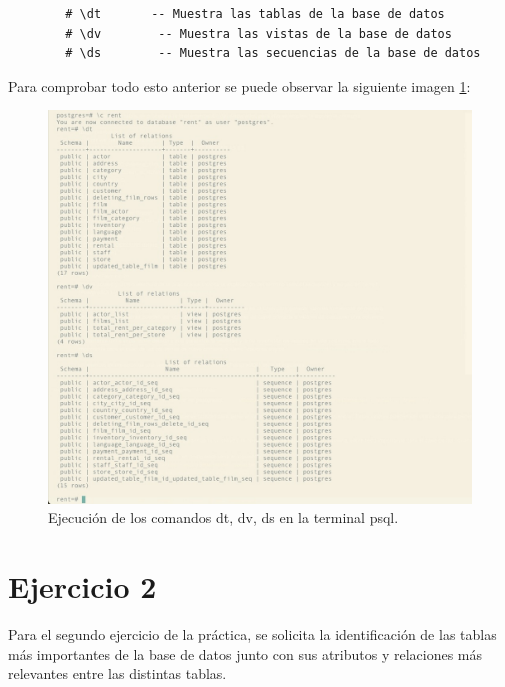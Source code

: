 \documentclass[11pt]{report}
\begin{document}
	\begin{verbatim}
		# \dt 		-- Muestra las tablas de la base de datos 
		# \dv		 -- Muestra las vistas de la base de datos
		# \ds		 -- Muestra las secuencias de la base de datos
	\end{verbatim}

	Para comprobar todo esto anterior se puede observar la siguiente imagen \ref{fig:Exercice-1}:

	\begin{figure}[H]
    \centering
    \includegraphics[scale=0.4]{img/Exercice-1-Comprobation.jpeg}
    \caption{Ejecución de los comandos dt, dv, ds en la terminal psql.}
    \label{fig:Exercice-1}
  \end{figure}

	\section{Ejercicio 2}
	Para el segundo ejercicio de la práctica, se solicita la identificación de las tablas más importantes de la base de datos junto con sus atributos y relaciones más relevantes entre las distintas tablas.
\\	
\end{document}

